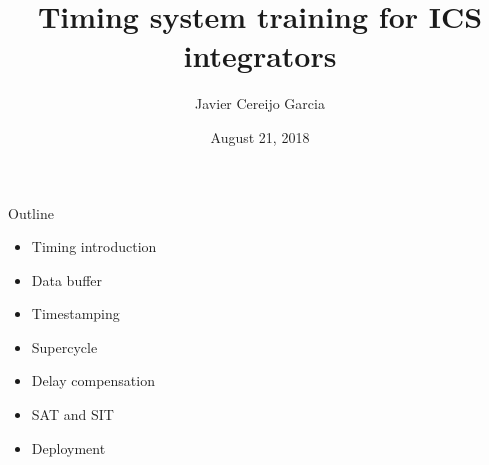\documentclass[
  9pt
  , table
  , ignorenonframetext
]{beamer}
\title{Timing system training for ICS integrators}
\author{Javier Cereijo Garcia}%
\institute{
  Integrated Control System Division\\
  \textbf{ESS}, Sweden
}
\date{August 21, 2018}
\begin{document}
\begin{frame}[plain]
  \titlepage
\end{frame}


\begin{frame}{Outline}
    \begin{itemize}
    \item Timing introduction
    \item Data buffer
    \item Timestamping
    \item Supercycle
    \item Delay compensation
    \item SAT and SIT
    \item Deployment
    \end{itemize}
\end{frame}
\end{document}
